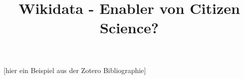 \documentclass{article}
\begin{document}
\title{Wikidata - Enabler von Citizen Science?}

\maketitle





[hier ein Beispiel aus der Zotero Bibliographie]
\end{document}

